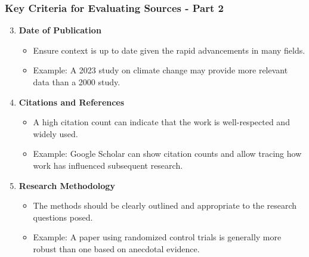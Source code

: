 \documentclass[aspectratio=169]{beamer}
\begin{document}
\begin{frame}[fragile]
    \frametitle{Key Criteria for Evaluating Sources - Part 2}
    \begin{enumerate}
        \setcounter{enumi}{2}  %
        \item \textbf{Date of Publication}
        \begin{itemize}
            \item Ensure context is up to date given the rapid advancements in many fields.
            \item Example: A 2023 study on climate change may provide more relevant data than a 2000 study.
        \end{itemize}
        
        \item \textbf{Citations and References}
        \begin{itemize}
            \item A high citation count can indicate that the work is well-respected and widely used.
            \item Example: Google Scholar can show citation counts and allow tracing how work has influenced subsequent research.
        \end{itemize}
        
        \item \textbf{Research Methodology}
        \begin{itemize}
            \item The methods should be clearly outlined and appropriate to the research questions posed.
            \item Example: A paper using randomized control trials is generally more robust than one based on anecdotal evidence.
        \end{itemize}
    \end{enumerate}
\end{frame}
\end{document}
